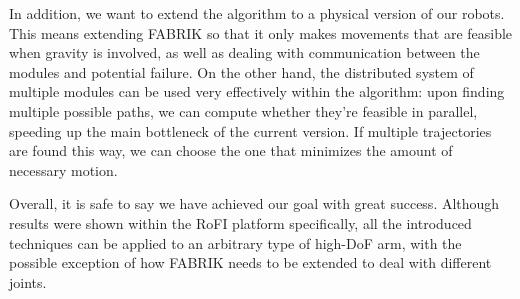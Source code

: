In addition, we want to extend the algorithm to a physical version of our robots. This means extending FABRIK so that it only makes movements that are feasible when gravity is involved, as well as dealing with communication between the modules and potential failure. On the other hand, the distributed system of multiple modules can be used very effectively within the algorithm: upon finding multiple possible paths, we can compute whether they're feasible in parallel, speeding up the main bottleneck of the current version. If multiple trajectories are found this way, we can choose the one that minimizes the amount of necessary motion.

Overall, it is safe to say we have achieved our goal with great success. Although results were shown within the RoFI platform specifically, all the introduced techniques can be applied to an arbitrary type of high-DoF arm, with the possible exception of how FABRIK needs to be extended to deal with different joints.
